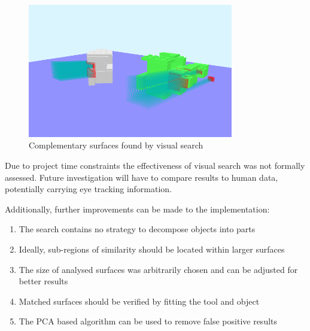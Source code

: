 \documentclass[11]{article}
\begin{document}
\begin{figure}[!h]
  \centering
  \includegraphics[width=0.8\textwidth]{figures/visual_search.png}
  \caption{Complementary surfaces found by visual search}
  \label{fig:visual_search}
\end{figure}  

Due to project time constraints the effectiveness of visual search was not formally assessed. 
Future investigation will have to compare results to human data, potentially carrying eye tracking information. 

Additionally, further improvements can be made to the implementation:
\begin{enumerate}
   \item The search contains no strategy to decompose objects into parts 
   \item Ideally, sub-regions of similarity should be located within larger surfaces 
   \item The size of analysed surfaces was arbitrarily chosen and can be adjusted for better results  
   \item Matched surfaces should be verified by fitting the tool and object 
   \item The PCA based algorithm can be used to remove false positive results 
\end{enumerate}

\end{document}

